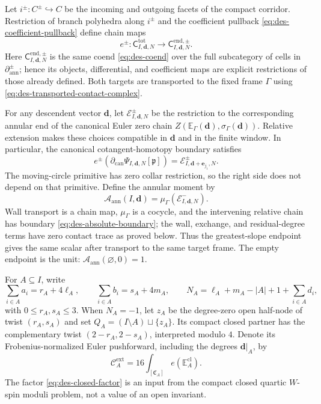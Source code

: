 Let $i^\pm:C^\pm\hookrightarrow C$ be the incoming and outgoing facets of
the compact corridor.  Restriction of branch polyhedra along $i^\pm$ and the
coefficient pullback \eqref{eq:des-coefficient-pullback} define chain maps
\begin{equation}
 e^\pm:\mathsf C^{\mathrm{tot}}_{I,\mathbf d,N}
 \longrightarrow\mathsf C^{\mathrm{end},\pm}_{I,\mathbf d,N}.
 \label{eq:des-endpoint-maps}
\end{equation}
Here $\mathsf C^{\mathrm{end},\pm}_{I,\mathbf d,N}$ is the same coend
\eqref{eq:des-coend} over the full subcategory of cells in
$\partial_{\mathrm{ann}}^\pm$; hence its objects, differential, and
coefficient maps are explicit restrictions of those already defined.  Both
targets are transported to the fixed frame $\Gamma$ using
\eqref{eq:des-transported-contact-complex}.

For any descendent vector $\mathbf d$, let
$\mathcal E^\pm_{I,\mathbf d,N}$ be the restriction to the corresponding
annular end of the canonical Euler zero chain
$Z(\mathbb E_\Gamma(\mathbf d),\sigma_\Gamma(\mathbf d))$.  Relative
extension makes these choices compatible in $\mathbf d$ and in the finite
window.  In particular, the canonical cotangent-homotopy boundary satisfies
\begin{equation}
 e^\pm(\partial_{\mathrm{can}}
       \Psi_{I,\mathbf d,N}[\mathfrak p])
 =\mathcal E^\pm_{I,\mathbf d+\mathbf e_{j_1},N}.
 \label{eq:des-endpoint-degree-shift}
\end{equation}
The moving-circle primitive has zero collar restriction, so the right side
does not depend on that primitive.  Define the annular moment by
\begin{equation}
 \mathcal A_{\mathrm{ann}}(I,\mathbf d)
 =\mu_\Gamma(\mathcal E^-_{I,\mathbf d,N}).
 \label{eq:des-annular-moment}
\end{equation}
Wall transport is a chain map, $\mu_\Gamma$ is a cocycle, and the intervening
relative chain has boundary \eqref{eq:des-absolute-boundary}; the wall,
exchange, and residual-degree terms have zero contact trace as proved below.
Thus the greatest-slope endpoint gives the same scalar after transport to the
same target frame.  The empty endpoint is the unit:
$\mathcal A_{\mathrm{ann}}(\varnothing,0)=1$.

For $A\subseteq I$, write
\begin{equation}
 \sum_{i\in A}a_i=r_A+4\ell_A,\qquad
 \sum_{i\in A}b_i=s_A+4m_A,
 \qquad
 N_A=\ell_A+m_A-|A|+1+\sum_{i\in A}d_i,
 \label{eq:des-threshold}
\end{equation}
with $0\leq r_A,s_A\leq3$.  When $N_A=-1$, let $z_A$ be the
degree-zero open half-node of twist $(r_A,s_A)$ and set
$Q_A=(I\setminus A)\sqcup\{z_A\}$.  Its compact closed partner has the
complementary twist $(2-r_A,2-s_A)$, interpreted modulo $4$.  Denote its
Frobenius-normalized Euler pushforward, including the degrees
$\mathbf d|_A$, by
\begin{equation}
 \mathcal C_A^{\mathrm{ext}}
 =16\int_{[\mathfrak C_A]}e(\mathbb E_A^{\mathrm{cl}}).
 \label{eq:des-closed-factor}
\end{equation}
The factor \eqref{eq:des-closed-factor} is an input from the compact closed
quartic $W$-spin moduli problem, not a value of an open invariant.

